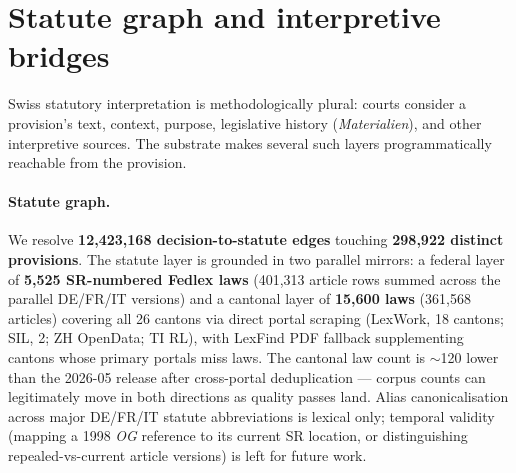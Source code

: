 \documentclass[11pt,a4paper]{article}
\begin{document}
\section{Statute graph and interpretive bridges}\label{sec:statutes}

Swiss statutory interpretation is methodologically plural: courts consider a provision's text, context, purpose, legislative history (\emph{Materialien}), and other interpretive sources. The substrate makes several such layers programmatically reachable from the provision.

\paragraph{Statute graph.} We resolve \textbf{12{,}423{,}168 decision-to-statute edges} touching \textbf{298{,}922 distinct provisions}. The statute layer is grounded in two parallel mirrors: a federal layer of \textbf{5{,}525 SR-numbered Fedlex laws} (401{,}313 article rows summed across the parallel DE/FR/IT versions) and a cantonal layer of \textbf{15{,}600 laws} (361{,}568 articles) covering all 26 cantons via direct portal scraping (LexWork, 18 cantons; SIL, 2; ZH OpenData; TI RL), with LexFind PDF fallback supplementing cantons whose primary portals miss laws. The cantonal law count is $\sim$120 lower than the 2026-05 release after cross-portal deduplication --- corpus counts can legitimately move in both directions as quality passes land. Alias canonicalisation across major DE/FR/IT statute abbreviations is lexical only; temporal validity (mapping a 1998 \emph{OG} reference to its current SR location, or distinguishing repealed-vs-current article versions) is left for future work.


\FloatBarrier
\end{document}
